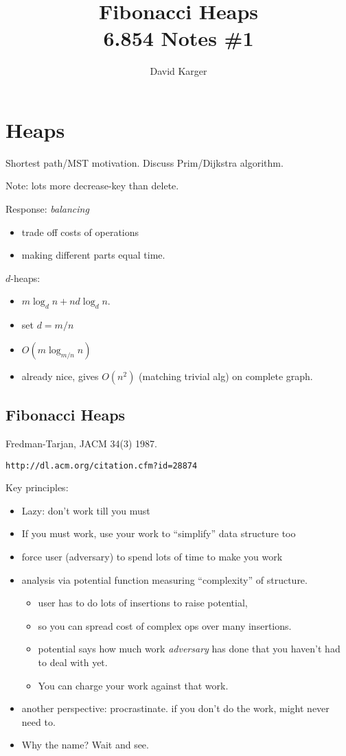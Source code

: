 \documentclass{article}
\title{Fibonacci Heaps\\ 6.854 Notes \#1}
\author{David Karger}
\begin{document}

\section{Heaps}

Shortest path/MST motivation.  Discuss Prim/Dijkstra algorithm.

Note: lots more decrease-key than delete.

Response: \emph{balancing} 
\begin{itemize}
\item trade off costs of operations
\item making different parts equal time.
\end{itemize}

$d$-heaps:
\begin{itemize}
\item  $m\log_d n + nd\log_d n$. 
\item set $d=m/n$
\item $O(m\log_{m/n} n)$
\item already nice, gives $O(n^2)$ (matching trivial alg) on complete graph.
\end{itemize}

\subsection{Fibonacci Heaps}

Fredman-Tarjan, JACM 34(3) 1987. 

{\tt  http://dl.acm.org/citation.cfm?id=28874} 

Key principles:
\begin{itemize}
\item Lazy: don't work till you must
\item If you must work, use your work to ``simplify''
  data structure too
\item force user (adversary) to spend lots of time to make you work
\item analysis via potential function measuring ``complexity'' of
  structure.  
\begin{itemize}
\item user has to do lots of insertions to raise potential, 
\item so you can spread cost of complex ops over many insertions.  
\item potential says how much work \emph{adversary} has done that you
  haven't had to deal with yet.  
\item You can charge your work against that work.
\end{itemize}
\item another perspective: procrastinate.  if you don't do the work,
  might never need to.
\item Why the name?  Wait and see.
\end{itemize}
\end{document}
